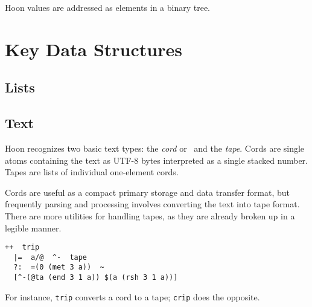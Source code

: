 
Hoon values are addressed as elements in a binary tree.



\section{Key Data Structures}

\subsection{Lists}

\subsection{Text}


Hoon recognizes two basic text types:  the \emph{cord} or \patt~and the \emph{tape}.  Cords are single atoms containing the text as UTF-8 bytes interpreted as a single stacked number.  Tapes are lists of individual one-element cords.


Cords are useful as a compact primary storage and data transfer format, but frequently parsing and processing involves converting the text into tape format.  There are more utilities for handling tapes, as they are already broken up in a legible manner.

\begin{lstlisting}
++  trip
  |=  a/@  ^-  tape
  ?:  =(0 (met 3 a))  ~
  [^-(@ta (end 3 1 a)) $(a (rsh 3 1 a))]
\end{lstlisting}


For instance, \texttt{trip} converts a cord to a tape; \texttt{crip} does the opposite.



